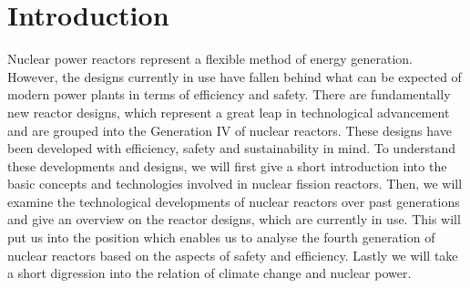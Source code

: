 \chapter{Introduction}
Nuclear power reactors represent a flexible method of energy generation. However, the designs
currently in use have fallen behind what can be expected of modern power plants in terms
of efficiency and safety. There are fundamentally new reactor designs, which represent
a great leap in technological advancement and are grouped into the Generation IV of nuclear reactors.
These designs have been developed with efficiency, safety and sustainability in mind.
To understand these developments and designs, we will first give a short introduction into the
basic concepts and technologies involved in nuclear fission reactors. Then, we will examine the
technological developments of nuclear reactors over past generations and give an overview on
the reactor designs, which are currently in use.
This will put us into the position which enables us to analyse the fourth generation
of nuclear reactors based on the aspects of safety and efficiency.
Lastly we will take a short digression into the relation of climate change and nuclear power.